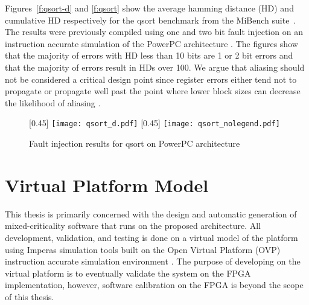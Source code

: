 	Figures~\ref{f:qsort-d} and \ref{f:qsort} show the average hamming distance (HD) and cumulative HD respectively for the qsort benchmark from the MiBench suite~\cite{guthaus2001mibench}. 
	The results were previously compiled using one and two bit fault injection on an instruction accurate simulation of the PowerPC architecture \cite{georgi}.
	The figures show that the majority of errors with HD less than 10 bits are 1 or 2 bit errors and that the majority of errors result in HDs over 100. 
	We argue that aliasing should not be considered a critical design point since register errors either tend not to propagate or propagate well past the point where lower block sizes can decrease the likelihood of aliasing \cite{Maxino:09}.
	
	
	
\begin{figure}
\centering
{}[0.45\textwidth]
{	
    \texttt{[image: qsort\_d.pdf]}
}%
\hfill
{}[0.45\textwidth]
{
    \texttt{[image: qsort\_nolegend.pdf]}
}%
\caption{Fault injection results for qsort on PowerPC architecture}
\label{f:ft-arch}
\end{figure}

\section{Virtual Platform Model}
\label{s:ovp}
	This thesis is primarily concerned with the design and automatic generation of mixed-criticality software that runs on the proposed architecture. 
	All development, validation, and testing is done on a virtual model of the platform using Imperas simulation tools \cite{imperas} built on the Open Virtual Platform (OVP) instruction accurate simulation environment \cite{ovp}. 
	The purpose of developing on the virtual platform is to eventually validate the system on the FPGA implementation, however, software
	calibration on the FPGA is beyond the scope of this thesis.

